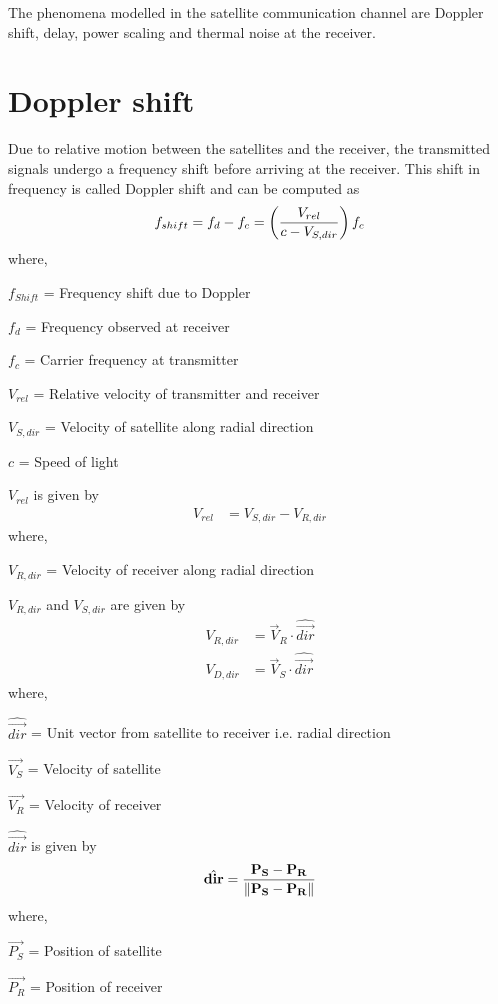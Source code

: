 The phenomena modelled in the satellite communication channel are Doppler shift, delay, power scaling and thermal noise at the receiver.
\section{Doppler shift}
Due to relative motion between the satellites and the receiver, the transmitted signals undergo a frequency shift before arriving at the receiver. This shift %
in frequency is called Doppler shift and can be computed as
\begin{equation}
    f_{shift} = f_{d}-f_{c} = \left(\frac{V_{rel}}{c-V_{S,dir}}\right)f_{c}  
\end{equation}
where,

$f_{Shift}$ = Frequency shift due to Doppler

$f_{d}$ = Frequency observed at receiver

$f_{c}$ = Carrier frequency at transmitter

$V_{rel}$ = Relative velocity of transmitter and receiver

$V_{S,dir}$ = Velocity of satellite along radial direction

$c$ = Speed of light

$V_{rel}$ is given by
\begin{align}
    V_{rel} &= V_{S,dir} - V_{R,dir}
\end{align}
where,

$V_{R,dir}$ = Velocity of receiver along radial direction

$V_{R,dir}$ and $V_{S,dir}$ are given by
\begin{align}
    V_{R,dir} &= \vec{V}_{R} \cdot \hat{\vec{dir}}\\
    V_{D,dir} &= \vec{V}_{S} \cdot \hat{\vec{dir}}
\end{align}
where,

$\hat{\vec{dir}}$ = Unit vector from satellite to receiver i.e. radial direction

$\vec{V_{S}}$ = Velocity of satellite

$\vec{V_{R}}$ = Velocity of receiver

$\hat{\vec{dir}}$ is given by
\begin{align}
    \hat{\mathbf{dir}} = \frac{\mathbf{P_{S}}-\mathbf{P_{R}}}{\left\lVert\mathbf{P_{S}}-\mathbf{P_{R}}\right\rVert}
\end{align}
where,

$\vec{P_{S}}$ = Position of satellite

$\vec{P_{R}}$ = Position of receiver


